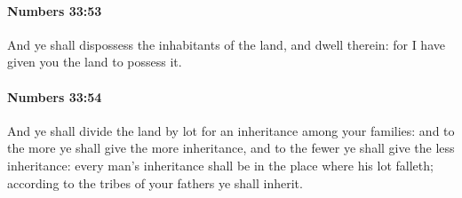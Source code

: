 		\paragraph{Numbers 33:53} %
			\label{NUMBERS-33-53}

			And ye shall dispossess the inhabitants of the land, and dwell therein: for I have given you the land to possess it.


		\paragraph{Numbers 33:54} %
			\label{NUMBERS-33-54}

			And ye shall divide the land by lot for an inheritance among your families: and to the more ye shall give the more inheritance, and to the fewer ye shall give the less inheritance: every man’s inheritance shall be in the place where his lot falleth; according to the tribes of your fathers ye shall inherit.

